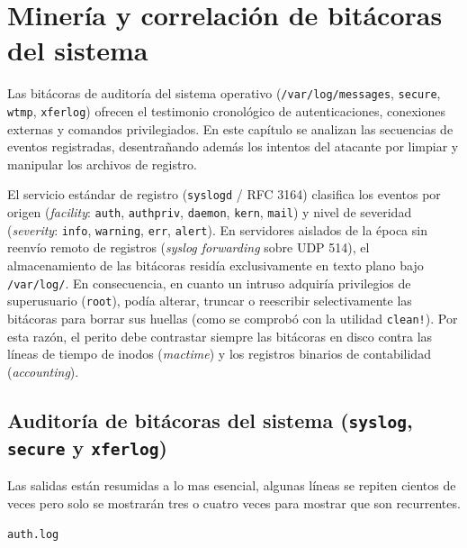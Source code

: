 \chapter{Minería y correlación de bitácoras del sistema}

Las bitácoras de auditoría del sistema operativo (\texttt{/var/log/messages}, \texttt{secure}, \texttt{wtmp}, \texttt{xferlog}) ofrecen el testimonio cronológico de autenticaciones, conexiones externas y comandos privilegiados. En este capítulo se analizan las secuencias de eventos registradas, desentrañando además los intentos del atacante por limpiar y manipular los archivos de registro.

\begin{notaforense}
El servicio estándar de registro (\texttt{syslogd} / RFC 3164) clasifica los eventos por origen (\textit{facility}: \texttt{auth}, \texttt{authpriv}, \texttt{daemon}, \texttt{kern}, \texttt{mail}) y nivel de severidad (\textit{severity}: \texttt{info}, \texttt{warning}, \texttt{err}, \texttt{alert}). En servidores aislados de la época sin reenvío remoto de registros (\textit{syslog forwarding} sobre UDP 514), el almacenamiento de las bitácoras residía exclusivamente en texto plano bajo \texttt{/var/log/}. En consecuencia, en cuanto un intruso adquiría privilegios de superusuario (\texttt{root}), podía alterar, truncar o reescribir selectivamente las bitácoras para borrar sus huellas (como se comprobó con la utilidad \texttt{clean!}). Por esta razón, el perito debe contrastar siempre las bitácoras en disco contra las líneas de tiempo de inodos (\textit{mactime}) y los registros binarios de contabilidad (\textit{accounting}).
\end{notaforense}

\section{Auditoría de bitácoras del sistema (\texttt{syslog}, \texttt{secure} y \texttt{xferlog})}

Las salidas están resumidas a lo mas esencial, algunas líneas se
repiten cientos de veces pero solo se mostrarán tres o cuatro veces
para mostrar que son recurrentes.

\texttt{auth.log}

\vspace{1em}

